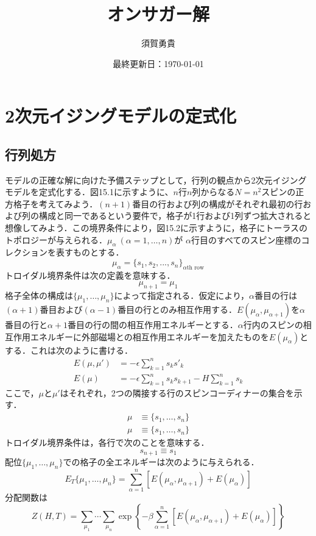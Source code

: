 \documentclass[a4paper,11pt]{jsarticle}
\begin{document}
\title{オンサガー解}
\author{須賀勇貴}
\date{最終更新日：\today}
\maketitle

\section{2次元イジングモデルの定式化}

\subsection*{行列処方}
モデルの正確な解に向けた予備ステップとして，行列の観点から2次元イジングモデルを定式化する．図15.1に示すように、$n$行$n$列からなる$N = n^2$スピンの正方格子を考えてみよう．$(n+1)$番目の行および列の構成がそれぞれ最初の行および列の構成と同一であるという要件で，格子が1行および1列ずつ拡大されると想像してみよう．この境界条件により，図15.2に示すように，格子にトーラスのトポロジーが与えられる．$\mu_{\alpha} \ (\alpha = 1, \dots, n)$が $\alpha$行目のすべてのスピン座標のコレクションを表すものとする．
\begin{equation}
  \mu_{\alpha} 
  = \{s_1, s_2, ..., s_n \}_{\alpha \text{th row}}
\end{equation}
トロイダル境界条件は次の定義を意味する．
\begin{equation}
  \mu_{n+1} = \mu_1
\end{equation}
格子全体の構成は$\{\mu_1, \dots, \mu_n \}$によって指定される．仮定により，$\alpha$番目の行は$(\alpha + 1)$番目および$(\alpha -1)$番目の行とのみ相互作用する．$E(\mu_{\alpha}, \mu_{\alpha+1})$を$\alpha$番目の行と$\alpha+1$番目の行の間の相互作用エネルギーとする．$\alpha$行内のスピンの相互作用エネルギーに外部磁場との相互作用エネルギーを加えたものを$E(\mu_{\alpha})$とする．これは次のように書ける．
\begin{align}
  E(\mu, \mu') 
  &= -\epsilon \sum_{k=1}^n s_k s'_k \\
  E(\mu) 
  &= -\epsilon \sum_{k=1}^n s_k s_{k+1} - H \sum_{k=1}^n s_k
\end{align}
ここで，$\mu$と$\mu'$はそれぞれ，2つの隣接する行のスピンコーディナーの集合を示す．
\begin{align}
  \mu &\equiv \{s_1, \dots, s_n \} \\
  \mu &\equiv \{s_1, \dots, s_n \}
\end{align}
トロイダル境界条件は，各行で次のことを意味する．
\begin{equation}
  s_{n+1} \equiv s_1
\end{equation}
配位$\{\mu_1, \dots, \mu_n \}$での格子の全エネルギーは次のように与えられる．
\begin{equation}
  E_T\{\mu_1, \dots, \mu_n \}
  = \sum_{\alpha=1}^n [E(\mu_{\alpha}, \mu_{\alpha+1}) + E(\mu_{\alpha})]
\end{equation}
分配関数は
\begin{equation}
  Z(H,T) 
  = \sum_{\mu_1} \cdots \sum_{\mu_n} \exp{\left\{ -\beta \sum_{\alpha=1}^n [E(\mu_{\alpha}, \mu_{\alpha+1}) + E(\mu_{\alpha})] \right\}}
\end{equation}
\end{document}
